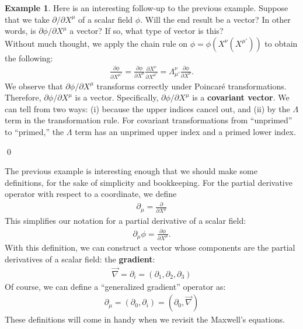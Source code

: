 \documentclass{book}
\theoremstyle{definition}
\newtheorem{exmp}{Example}[section]
\begin{document}
\begin{exmp}
	Here is an interesting follow-up to the previous example. Suppose that we take ${\partial }/{\partial X^\mu}$ of a scalar field $\phi$. Will the end result be a vector? In other words, is ${\partial \phi}/{\partial X^\mu}$ a vector? If so, what type of vector is this?\\
	
	Without much thought, we apply the chain rule on $\phi = \phi\left(X^{\nu}\left(X^{\mu'} \right)  \right) $ to obtain the following:
	\begin{align*}
	\frac{\partial \phi}{\partial X^{\mu'}} = \frac{\partial \phi}{\partial X^{\nu}}\frac{\partial X^\nu}{\partial X^{\mu'}} = \Lambda^\nu_{\mu'}\frac{\partial \phi}{\partial X^{\nu}}.
	\end{align*}
	We observe that $\partial \phi / \partial X^{\mu}$ transforms correctly under Poincar\'e transformations. Therefore, $\partial \phi / \partial X^{\mu}$ is a vector. Specifically, $\partial \phi / \partial X^{\mu}$ is a \textbf{covariant vector}. We can tell from two ways: (i) because the upper indices cancel out, and (ii) by the $\Lambda$ term in the transformation rule. For covariant transformations from ``unprimed'' to ``primed,'' the $\Lambda$ term has an unprimed upper index and a primed lower index.\\
\end{exmp}\qed

The previous example is interesting enough that we should make some definitions, for the sake of simplicity and bookkeeping. For the partial derivative operator with respect to a coordinate, we define
\begin{align*}
\boxed{\partial_\mu = \frac{\partial }{\partial X^\mu}}
\end{align*}
This simplifies our notation for a partial derivative of a scalar field:
\begin{align*}
\partial_\mu \phi= \frac{\partial \phi}{\partial X^\mu}.
\end{align*}
With this definition, we can construct a vector whose components are the partial derivatives of a scalar field: the \textbf{gradient}:
\begin{align*}
\boxed{\vec{\nabla} = \partial_i = (\partial_1, \partial_2, \partial_3)}
\end{align*}
Of course, we can define a ``generalized gradient'' operator as:
\begin{align*}
\boxed{\partial_\mu = \left( \partial_0, \partial_i\right)  = \left( \partial_0, \vec{\nabla}\right) }
\end{align*}
These definitions will come in handy when we revisit the Maxwell's equations.\\
\end{document}
